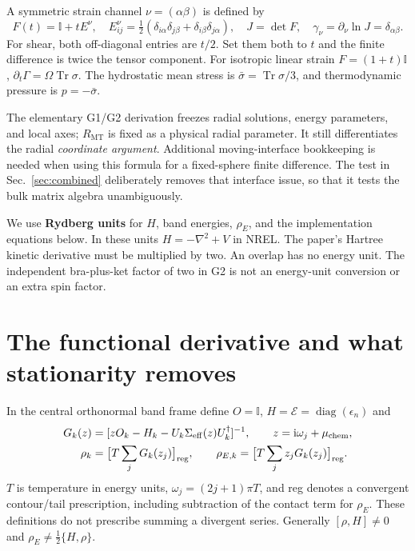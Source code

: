 \documentclass[11pt]{article}
\newcommand{\Tr}{\operatorname{Tr}}
\newcommand{\Id}{\mathbb I}
\newcommand{\ii}{\mathrm i}
\newcommand{\MT}{\mathrm{MT}}
\begin{document}
A symmetric strain channel $\nu=(\alpha\beta)$ is defined by
\begin{equation}
 F(t)=\Id+tE^\nu,\quad E^\nu_{ij}=\tfrac12(\delta_{i\alpha}\delta_{j\beta}+\delta_{i\beta}\delta_{j\alpha}),\quad
 J=\det F,\quad \gamma_\nu=\partial_\nu\ln J=\delta_{\alpha\beta}.
\end{equation}
For shear, both off-diagonal entries are $t/2$. Set them both to $t$ and the finite difference is twice the tensor component. For isotropic linear strain $F=(1+t)\Id$, $\partial_t\Gamma=\Omega\Tr\sigma$. The hydrostatic mean stress is $\bar\sigma=\Tr\sigma/3$, and thermodynamic pressure is $p=-\bar\sigma$.

The elementary G1/G2 derivation freezes radial solutions, energy parameters, and local axes; $R_{\MT}$ is fixed as a physical radial parameter. It still differentiates the radial \emph{coordinate argument}. Additional moving-interface bookkeeping is needed when using this formula for a fixed-sphere finite difference. The test in Sec.~\ref{sec:combined} deliberately removes that interface issue, so that it tests the bulk matrix algebra unambiguously.

We use \textbf{Rydberg units} for $H$, band energies, $\rho_E$, and the implementation equations below. In these units $H=-\nabla^2+V$ in NREL. The paper's Hartree kinetic derivative must be multiplied by two. An overlap has no energy unit. The independent bra-plus-ket factor of two in G2 is not an energy-unit conversion or an extra spin factor.

\section{The functional derivative and what stationarity removes}
In the central orthonormal band frame define $O=\Id$, $H=\mathcal E=\operatorname{diag}(\epsilon_n)$ and
\begin{align}
 G_k(z)&=[zO_k-H_k-U_k\Sigma_{\rm eff}(z)U_k^\dagger]^{-1},\qquad z=\ii\omega_j+\mu_{\rm chem},\\
 \rho_k&=\big[T\sum_jG_k(z_j)\big]_{\rm reg},\qquad
 \rho_{E,k}=\big[T\sum_jz_jG_k(z_j)\big]_{\rm reg}.
\end{align}
$T$ is temperature in energy units, $\omega_j=(2j+1)\pi T$, and reg denotes a convergent contour/tail prescription, including subtraction of the contact term for $\rho_E$. These definitions do not prescribe summing a divergent series. Generally $[\rho,H]\ne0$ and $\rho_E\ne\frac12\{H,\rho\}$.
\end{document}
